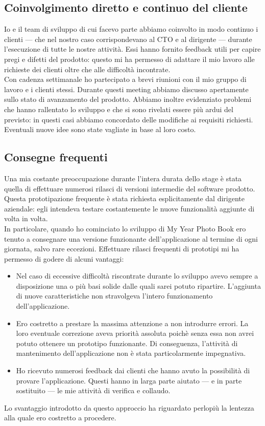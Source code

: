 		\subsection{Coinvolgimento diretto e continuo del cliente}
			Io e il team di sviluppo di cui facevo parte abbiamo coinvolto in modo continuo i clienti — che nel nostro caso
			corrispondevano al CTO e al dirigente — durante l'esecuzione di tutte le nostre attività. Essi hanno fornito feedback utili
			per capire pregi e difetti del prodotto: questo mi ha permesso di adattare il mio lavoro alle richieste dei clienti oltre che
			alle difficoltà incontrate.\\
			Con cadenza settimanale ho partecipato a brevi riunioni con il mio gruppo di lavoro e i clienti stessi. Durante questi
			meeting abbiamo discusso apertamente sullo stato di avanzamento del prodotto. Abbiamo inoltre evidenziato problemi che
			hanno rallentato lo sviluppo e che si sono rivelati essere più ardui del previsto: in questi casi abbiamo concordato delle
			modifiche ai requisiti richiesti. Eventuali nuove idee sono state vagliate in base al loro costo.
		\subsection{Consegne frequenti}
			Una mia costante preoccupazione durante l'intera durata dello stage è stata quella di effettuare numerosi rilasci di versioni
			intermedie del software prodotto. Questa prototipazione frequente è stata richiesta esplicitamente dal dirigente aziendale:
			egli intendeva testare costantemente le nuove funzionalità aggiunte di volta in volta.\\
			In particolare, quando ho cominciato lo sviluppo di My Year Photo Book ero tenuto a consegnare una versione funzionante
			dell'applicazione al termine di ogni giornata, salvo rare eccezioni. Effettuare rilasci frequenti di prototipi mi ha permesso
			di godere di alcuni vantaggi:
			\begin{itemize}
				\item Nel caso di eccessive difficoltà riscontrate durante lo sviluppo avevo sempre a disposizione una o più basi
				solide dalle quali sarei potuto ripartire. L'aggiunta di nuove caratteristiche non stravolgeva l'intero funzionamento
				dell'applicazione.
				\item Ero costretto a prestare la massima attenzione a non introdurre errori. La loro eventuale correzione aveva
				priorità assoluta poichè senza essa non avrei potuto ottenere un prototipo funzionante. Di conseguenza, l'attività di
				mantenimento dell'applicazione non è stata particolarmente impegnativa.
				\item Ho ricevuto numerosi feedback dai clienti che hanno avuto la possibilità di provare l'applicazione. Questi
				hanno in larga parte aiutato — e in parte sostituito — le mie attività di verifica e collaudo.
			 \end{itemize}
			 Lo svantaggio introdotto da questo approccio ha riguardato perlopiù la lentezza alla quale ero costretto a procedere.
